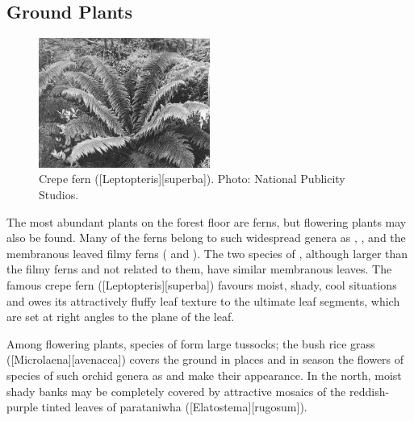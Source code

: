 \subsection{Ground Plants}

\begin{figure}
	\includegraphics[width=0.5\textwidth]{graphics/figure62crepefern.jpg}
	\centering
	\caption[Crepe fern (\emph{Leptopteris superba})]{Crepe fern ([Leptopteris][superba]).
	Photo: National Publicity Studios.}%
	\label{fig:62crepefern}
\end{figure}

The most abundant plants on the forest floor are ferns, but flowering plants may also be found.
Many of the ferns belong to such widespread genera as , ,  and the membranous leaved filmy ferns ( and ).
The two species of , although larger than the filmy ferns and not related to them, have similar membranous leaves.
The famous crepe fern ([Leptopteris][superba]) favours moist, shady, cool situations and owes its attractively fluffy leaf texture to the ultimate leaf segments, which are set at right angles to the plane of the leaf.

Among flowering plants, species of  form large tussocks; the bush rice grass ([Microlaena][avenacea]) covers the ground in places and in season the flowers of species of such orchid genera as  and  make their appearance.
In the north, moist shady banks may be completely covered by attractive mosaics of the reddish-purple tinted leaves of parataniwha ([Elatostema][rugosum]).

